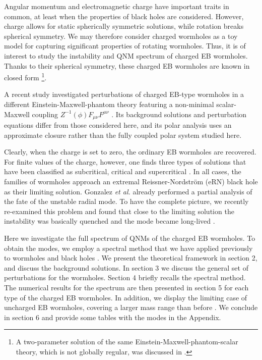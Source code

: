 \documentclass[11pt,a4paper]{article}
\begin{document}
Angular momentum and electromagnetic charge have important traits in common, at least when the properties of black holes are considered.
However, charge allows for static spherically symmetric solutions, while rotation breaks spherical symmetry.
We may therefore consider charged wormholes as a toy model for capturing significant properties of rotating wormholes.
Thus, it is of interest to study the instability and QNM spectrum of charged EB wormholes.
Thanks to their spherical symmetry, these charged EB wormholes are known in closed form \cite{Gonzalez:2009hn}\footnote{
A two-parameter solution of the same Einstein-Maxwell-phantom-scalar theory, which is not globally regular, 
was discussed in \cite{Turimov:2025zxy}.
}.

A recent study investigated perturbations of charged EB-type wormholes in a different Einstein-Maxwell-phantom theory featuring a non-minimal scalar-Maxwell coupling $Z^{-1}(\phi)F_{\mu\nu}F^{\mu\nu}$ \cite{Wu:2025wlz}. 
Its background solutions and perturbation equations differ from those considered here, and its polar analysis uses an approximate closure rather than the fully coupled polar system studied here.

Clearly, when the charge is set to zero, the ordinary EB wormholes are recovered.
For finite values of the charge, however, one finds three types of solutions that have been classified as subcritical, critical and supercritical \cite{Gonzalez:2009hn}.
In all cases, the families of wormholes approach an extremal Reissner-Nordstr\"om (eRN) black hole as their limiting solution.
Gonzalez \textit{et al.} \cite{Gonzalez:2009hn} already performed a partial analysis of the fate of the unstable radial mode.
To have the complete picture, we recently re-examined this problem and found that close to the limiting solution the instability was basically quenched and the mode became long-lived \cite{Blazquez-Salcedo:2025dit}.

Here we investigate the full spectrum of QNMs of the charged EB wormholes.
To obtain the modes, we employ a spectral method that we have applied previously to wormholes and black holes \cite{Khoo:2024yeh,Blazquez-Salcedo:2025dit,Blazquez-Salcedo:2023hwg,Blazquez-Salcedo:2024oek,Blazquez-Salcedo:2024dur,Khoo:2024agm}.
We present the theoretical framework in section 2, and discuss the background solutions.
In section 3 we discuss the general set of perturbations for the wormholes.
Section 4 briefly recalls the spectral method.
The numerical results for the spectrum are then presented in section 5 for each type of the charged EB wormholes.
In addition, we display the limiting case of uncharged EB wormholes, covering a larger mass range than before \cite{Azad:2023iju}.
We conclude in section 6 and provide some tables with the modes in the Appendix.
\end{document}
